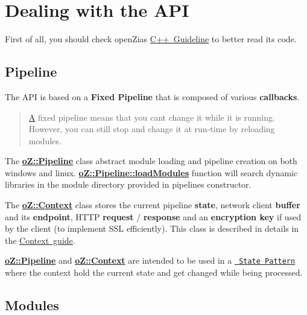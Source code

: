\section*{Dealing with the A\+PI}

First of all, you should check open\+Zia\textquotesingle{}s \mbox{\hyperlink{md__g_u_i_d_e_l_i_n_e}{C++ Guideline}} to better read its code.

\subsection*{Pipeline}

The A\+PI is based on a {\bfseries{Fixed Pipeline}} that is composed of various {\bfseries{callbacks}}.

\begin{quote}
\mbox{\hyperlink{class_a}{A}} fixed pipeline means that you can\textquotesingle{}t change it while it is running. However, you can still stop and change it at run-\/time by reloading modules. \end{quote}


The {\bfseries{\mbox{\hyperlink{classo_z_1_1_pipeline}{o\+Z\+::\+Pipeline}}}} class abstract module loading and pipeline creation on both windows and linux. {\bfseries{\mbox{\hyperlink{classo_z_1_1_pipeline_a2815743412c13100c68fee0d87283417}{o\+Z\+::\+Pipeline\+::load\+Modules}}}} function will search dynamic libraries in the module directory provided in pipeline\textquotesingle{}s constructor.

The {\bfseries{\mbox{\hyperlink{classo_z_1_1_context}{o\+Z\+::\+Context}}}} class stores the current pipeline {\bfseries{state}}, network client {\bfseries{buffer}} and its {\bfseries{endpoint}}, H\+T\+TP {\bfseries{request}} / {\bfseries{response}} and an {\bfseries{encryption key}} if used by the client (to implement S\+SL efficiently). This class is described in details in the \mbox{\hyperlink{md__c_o_n_t_e_x_t}{Context guide}}.

{\bfseries{\mbox{\hyperlink{classo_z_1_1_pipeline}{o\+Z\+::\+Pipeline}}}} and {\bfseries{\mbox{\hyperlink{classo_z_1_1_context}{o\+Z\+::\+Context}}}} are intended to be used in a \href{https://en.wikipedia.org/wiki/State_pattern}{\texttt{ State Pattern}} where the context hold the current state and get changed while being processed.

\subsection*{Modules}

